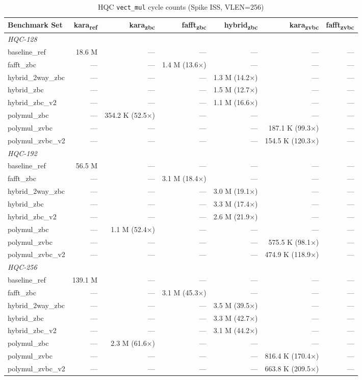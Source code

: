 \begin{table}[h]
  \centering
  \caption{HQC \texttt{vect_mul} cycle counts (Spike ISS, VLEN=256)}
  \label{tab:vect_mul_counts}
  \begin{tabular}{lrrrrrr}
    \toprule
    Benchmark Set & kara\textsubscript{ref} & kara\textsubscript{zbc} & fafft\textsubscript{zbc} & hybrid\textsubscript{zbc} & kara\textsubscript{zvbc} & fafft\textsubscript{zvbc} \\
    \midrule
    \multicolumn{7}{l}{\textit{HQC-128}} \\
    baseline_ref & 18.6 M & — & — & — & — & — \\
    fafft_zbc & — & — & 1.4 M (13.6×) & — & — & — \\
    hybrid_2way_zbc & — & — & — & 1.3 M (14.2×) & — & — \\
    hybrid_zbc & — & — & — & 1.5 M (12.7×) & — & — \\
    hybrid_zbc_v2 & — & — & — & 1.1 M (16.6×) & — & — \\
    polymul_zbc & — & 354.2 K (52.5×) & — & — & — & — \\
    polymul_zvbc & — & — & — & — & 187.1 K (99.3×) & — \\
    polymul_zvbc_v2 & — & — & — & — & 154.5 K (120.3×) & — \\
    \multicolumn{7}{l}{\textit{HQC-192}} \\
    baseline_ref & 56.5 M & — & — & — & — & — \\
    fafft_zbc & — & — & 3.1 M (18.4×) & — & — & — \\
    hybrid_2way_zbc & — & — & — & 3.0 M (19.1×) & — & — \\
    hybrid_zbc & — & — & — & 3.3 M (17.4×) & — & — \\
    hybrid_zbc_v2 & — & — & — & 2.6 M (21.9×) & — & — \\
    polymul_zbc & — & 1.1 M (52.4×) & — & — & — & — \\
    polymul_zvbc & — & — & — & — & 575.5 K (98.1×) & — \\
    polymul_zvbc_v2 & — & — & — & — & 474.9 K (118.9×) & — \\
    \multicolumn{7}{l}{\textit{HQC-256}} \\
    baseline_ref & 139.1 M & — & — & — & — & — \\
    fafft_zbc & — & — & 3.1 M (45.3×) & — & — & — \\
    hybrid_2way_zbc & — & — & — & 3.5 M (39.5×) & — & — \\
    hybrid_zbc & — & — & — & 3.3 M (42.7×) & — & — \\
    hybrid_zbc_v2 & — & — & — & 3.1 M (44.2×) & — & — \\
    polymul_zbc & — & 2.3 M (61.6×) & — & — & — & — \\
    polymul_zvbc & — & — & — & — & 816.4 K (170.4×) & — \\
    polymul_zvbc_v2 & — & — & — & — & 663.8 K (209.5×) & — \\
    \bottomrule
  \end{tabular}
\end{table}
